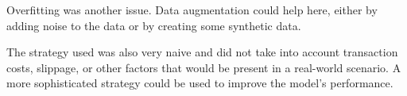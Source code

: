 Overfitting was another issue. Data augmentation could help here, either by adding noise to the data or by creating some synthetic data.

The strategy used was also very naive and did not take into account transaction costs, slippage, or other factors that would be present in a real-world scenario. A more sophisticated strategy could be used to improve the model's performance.




